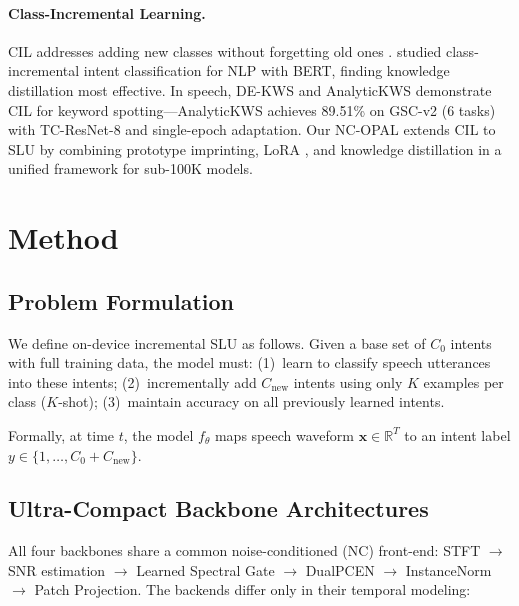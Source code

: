 \documentclass[11pt]{article}
\begin{document}
\paragraph{Class-Incremental Learning.}
CIL addresses adding new classes without forgetting old ones \cite{rebuffi2017icarl,masana2022class}.
\citet{paul2022incremental} studied class-incremental intent classification for NLP with BERT, finding knowledge distillation most effective.
In speech, DE-KWS \cite{dekws2025} and AnalyticKWS \cite{analytickws2025} demonstrate CIL for keyword spotting---AnalyticKWS achieves 89.51\% on GSC-v2 (6 tasks) with TC-ResNet-8 and single-epoch adaptation.
Our NC-OPAL extends CIL to SLU by combining prototype imprinting, LoRA \cite{hu2022lora}, and knowledge distillation \cite{hinton2015distilling} in a unified framework for sub-100K models.

\section{Method}

\subsection{Problem Formulation}

We define on-device incremental SLU as follows.
Given a base set of $C_0$ intents with full training data, the model must:
(1)~learn to classify speech utterances into these intents;
(2)~incrementally add $C_{\text{new}}$ intents using only $K$ examples per class ($K$-shot);
(3)~maintain accuracy on all previously learned intents.

Formally, at time $t$, the model $f_\theta$ maps speech waveform $\mathbf{x} \in \mathbb{R}^{T}$ to an intent label $y \in \{1, \ldots, C_0 + C_{\text{new}}\}$.

\subsection{Ultra-Compact Backbone Architectures}

All four backbones share a common noise-conditioned (NC) front-end: STFT $\rightarrow$ SNR estimation $\rightarrow$ Learned Spectral Gate $\rightarrow$ DualPCEN $\rightarrow$ InstanceNorm $\rightarrow$ Patch Projection.
The backends differ only in their temporal modeling:
\end{document}
